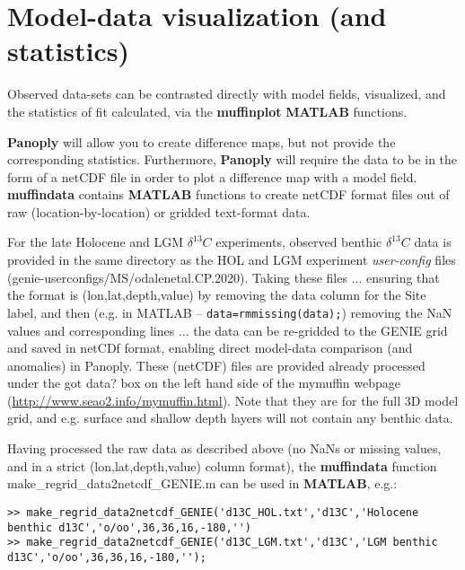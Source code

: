 \documentclass[11pt,fleqn]{book} %
\begin{document}
\section{Model-data visualization (and statistics)}

Observed data-sets can be contrasted directly with model fields, visualized, and the statistics of fit calculated, via the \textbf{muffinplot} \textbf{MATLAB} functions.

\textbf{Panoply} will allow you to create difference maps, but not provide the corresponding statistics. Furthermore, \textbf{Panoply} will require the data to be in the form of a netCDF file in order to plot a difference map with a model field. \textbf{muffindata} contains \textbf{MATLAB} functions to create netCDF format files out of raw (location-by-location) or gridded text-format data.

For the late Holocene and LGM \(\delta^{13}C\) experiments, observed benthic \(\delta^{13}C\) data is provided in the same directory as the HOL and LGM experiment \textit{user-config} files \linebreak (\textsf{\footnotesize genie-userconfigs/MS/odalenetal.CP.2020}). Taking these files ... ensuring that the format is \linebreak (lon,lat,depth,value) by removing the data column for the Site label, and then (e.g. in MATLAB -- \texttt{data=rmmissing(data);}) removing the NaN values and corresponding lines ... the data can be re-gridded to the GENIE grid and saved in netCDf format, enabling direct model-data comparison (and anomalies) in Panoply. These (netCDF) files are provided already processed under the \textsf{\footnotesize got data?} box on the left hand side of the mymuffin webpage (\href{http://www.seao2.info/mymuffin.html}{http://www.seao2.info/mymuffin.html}). Note that they are for the full 3D model grid, and e.g. surface and shallow depth layers will not contain any benthic data.

Having processed the raw data as described above (no NaNs or missing values, and in a strict (lon,lat,depth,value) column format), the \textbf{muffindata} function \textsf{\footnotesize make\_regrid\_data2netcdf\_GENIE.m} can be used in \textbf{MATLAB}, e.g.:
\scriptsize\begin{verbatim}
>> make_regrid_data2netcdf_GENIE('d13C_HOL.txt','d13C','Holocene benthic d13C','o/oo',36,36,16,-180,'')
>> make_regrid_data2netcdf_GENIE('d13C_LGM.txt','d13C','LGM benthic d13C','o/oo',36,36,16,-180,'');
\end{verbatim}\normalsize
\end{document}
